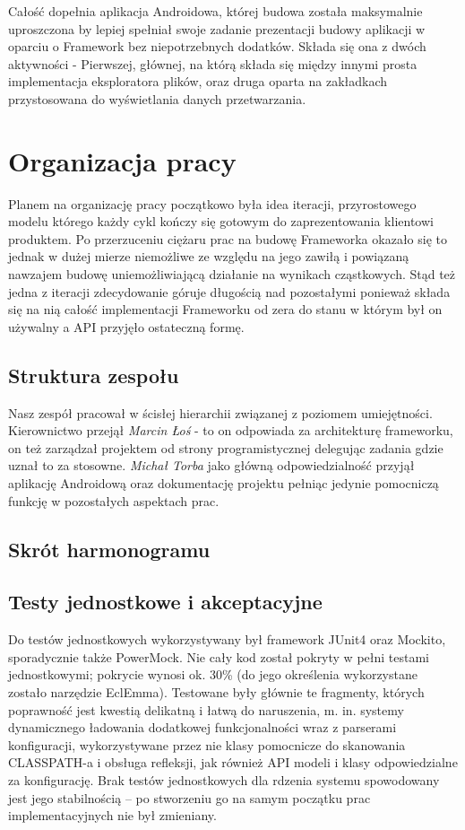 Całość dopełnia aplikacja Androidowa, której budowa została maksymalnie uproszczona by lepiej spełniał swoje zadanie prezentacji budowy aplikacji w oparciu o Framework bez niepotrzebnych dodatków. Składa się ona z dwóch aktywności - Pierwszej, głównej, na którą składa się między innymi prosta implementacja eksploratora plików, oraz druga oparta na zakładkach przystosowana do wyświetlania danych przetwarzania.

\chapter{Organizacja pracy}
Planem na organizację pracy początkowo była idea iteracji, przyrostowego modelu którego każdy cykl kończy się gotowym do zaprezentowania klientowi produktem. Po przerzuceniu ciężaru prac na budowę Frameworka okazało się to jednak w dużej mierze niemożliwe ze względu na jego zawiłą i powiązaną nawzajem budowę uniemożliwiającą działanie na wynikach cząstkowych. Stąd też jedna z iteracji zdecydowanie góruje długością nad pozostałymi ponieważ składa się na nią całość implementacji Frameworku od zera do stanu w którym był on używalny a API przyjęło ostateczną formę.

\section{Struktura zespołu}
Nasz zespół pracował w ścisłej hierarchii związanej z poziomem umiejętności. Kierownictwo przejął \emph{Marcin Łoś} - to on odpowiada za architekturę frameworku, on też zarządzał projektem od strony programistycznej delegując zadania gdzie uznał to za stosowne. \emph{Michał Torba} jako główną odpowiedzialność przyjął aplikację Androidową oraz dokumentację projektu pełniąc jedynie pomocniczą funkcję w pozostałych aspektach prac.
\section{Skrót harmonogramu}
\section{Testy jednostkowe i akceptacyjne}

Do testów jednostkowych wykorzystywany był framework JUnit4 oraz Mockito, sporadycznie także
PowerMock. Nie cały kod został pokryty w pełni testami jednostkowymi; pokrycie wynosi ok. 30\% (do
jego określenia wykorzystane zostało narzędzie EclEmma). Testowane były głównie te fragmenty,
których poprawność jest kwestią delikatną i łatwą do naruszenia, m. in. systemy dynamicznego
ładowania dodatkowej funkcjonalności wraz z parserami konfiguracji, wykorzystywane przez nie klasy
pomocnicze do skanowania CLASSPATH-a i obsługa refleksji, jak również API modeli i klasy
odpowiedzialne za konfigurację. Brak testów jednostkowych dla rdzenia systemu spowodowany jest jego
stabilnością -- po stworzeniu go na samym początku prac implementacyjnych nie był zmieniany.


